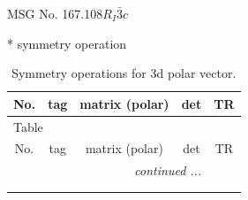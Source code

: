 \documentclass[fleqn,8pt]{jsarticle}
\begin{document}
\setcounter{MaxMatrixCols}{32}

\renewcommand{\tablename}{Table~}
\renewcommand{\figurename}{Figure~}
\begin{center}
\LARGE
MSG No. 167.108\quad$R_{I}\bar{3}c$
\end{center}
* symmetry operation
\renewcommand{\arraystretch}{1.3}
\begin{longtable}{ccccc}
\caption{Symmetry operations for 3d polar vector.}
 \\
 \hline \hline
No. & tag & matrix (polar) & det & TR \\ \hline \endfirsthead

\multicolumn{4}{l}{\tablename\ \thetable{}} \\
 \hline \hline
No. & tag & matrix (polar) & det & TR \\ \hline \endhead

 \hline \hline
\multicolumn{4}{r}{\footnotesize\it continued ...} \\ \endfoot

 \hline \hline
\multicolumn{4}{r}{} \\ \endlastfoot


\end{longtable}
\end{document}
